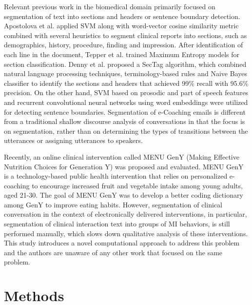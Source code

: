 \documentclass{amia}
\begin{document}
Relevant previous work in the biomedical domain primarily focused on segmentation of text into sections and headers\cite{apostolova2009automatic,denny2009evaluation,tepper2012statistical,cho2002text} or sentence boundary detection\cite{griffis2016quantitative,kreuzthaler2015detection,treviso2016sentence,fraser2015sentence}. Apostolova et al.\cite{apostolova2009automatic} applied SVM along with word-vector cosine similarity metric combined with several heuristics to segment clinical reports into sections, such as demographics, history, procedure, finding and impression. After identification of each line in the document, Tepper et al. \cite{tepper2012statistical} trained Maximum Entropy models for section classification. Denny et al.\cite{denny2009evaluation} proposed a SecTag algorithm, which combined natural language processing techniques, terminology-based rules and Naive Bayes classifier to identify the sections and headers that achieved 99\% recall with 95.6\% precision. On the other hand, SVM based on prosodic and part of speech features \cite{kreuzthaler2015detection} and recurrent convolutional neural networks using word embeddings \cite{griffis2016quantitative} were utilized for detecting sentence boundaries. Segmentation of e-Coaching emails is different from a traditional shallow discourse analysis of conversations \cite{galley2003discourse} in that the focus is on segmentation, rather than on determining the types of transitions between the utterances or assigning utterances to speakers.

Recently, an online clinical intervention called MENU GenY \cite{alexander2017motivations} (Making Effective Nutrition Choices for Generation Y) was proposed and evaluated. MENU GenY is a technology-based public health intervention that relies on personalized e-coaching to encourage increased fruit and vegetable intake among young adults, aged 21-30. The goal of MENU GenY was to develop a better coding dictionary among GenY to improve eating habits. However, segmentation of clinical conversation in the context of electronically delivered interventions, in particular, segmentation of clinical interaction text into groups of MI behaviors, is still performed manually, which slows down qualitative analysis of these interventions. This study introduces a novel computational approach to address this problem and the authors are unaware of any other work that focused on the same problem.  

\section*{Methods}
\end{document}
